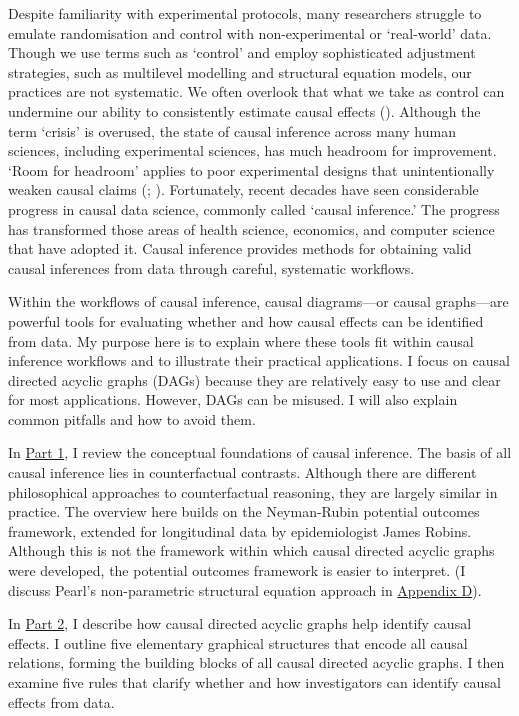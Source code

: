 \documentclass[
  single column]{article}
\begin{document}
Despite familiarity with experimental protocols, many researchers
struggle to emulate randomisation and control with non-experimental or
`real-world' data. Though we use terms such as `control' and employ
sophisticated adjustment strategies, such as multilevel modelling and
structural equation models, our practices are not systematic. We often
overlook that what we take as control can undermine our ability to
consistently estimate causal effects
(). Although
the term `crisis' is overused, the state of causal inference across many
human sciences, including experimental sciences, has much headroom for
improvement. `Room for headroom' applies to poor experimental designs
that unintentionally weaken causal claims
(;
). Fortunately,
recent decades have seen considerable progress in causal data science,
commonly called `causal inference.' The progress has transformed those
areas of health science, economics, and computer science that have
adopted it. Causal inference provides methods for obtaining valid causal
inferences from data through careful, systematic workflows.

Within the workflows of causal inference, causal diagrams---or causal
graphs---are powerful tools for evaluating whether and how causal
effects can be identified from data. My purpose here is to explain where
these tools fit within causal inference workflows and to illustrate
their practical applications. I focus on causal directed acyclic graphs
(DAGs) because they are relatively easy to use and clear for most
applications. However, DAGs can be misused. I will also explain common
pitfalls and how to avoid them.

In \hyperref[id-sec-1]{Part 1}, I review the conceptual foundations of
causal inference. The basis of all causal inference lies in
counterfactual contrasts. Although there are different philosophical
approaches to counterfactual reasoning, they are largely similar in
practice. The overview here builds on the Neyman-Rubin potential
outcomes framework, extended for longitudinal data by epidemiologist
James Robins. Although this is not the framework within which causal
directed acyclic graphs were developed, the potential outcomes framework
is easier to interpret. (I discuss Pearl's non-parametric structural
equation approach in \hyperref[id-app-d]{Appendix D}).

In \hyperref[id-sec-2]{Part 2}, I describe how causal directed acyclic
graphs help identify causal effects. I outline five elementary graphical
structures that encode all causal relations, forming the building blocks
of all causal directed acyclic graphs. I then examine five rules that
clarify whether and how investigators can identify causal effects from
data.
\end{document}
